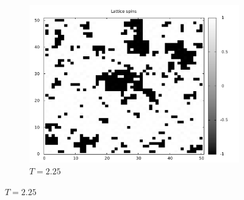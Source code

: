 \documentclass[]{article}
\begin{document}
\begin{figure}[ht!]
\begin{subfigure}[b]{0.3\linewidth}
  \includegraphics[width=\textwidth]{figures/spin_T_eq_2p25.pdf}
  \caption{$T=2.25$}
  \label{fig:spin_t_eq_2p25}
 \end{subfigure}
 

\end{figure}
\end{document}
